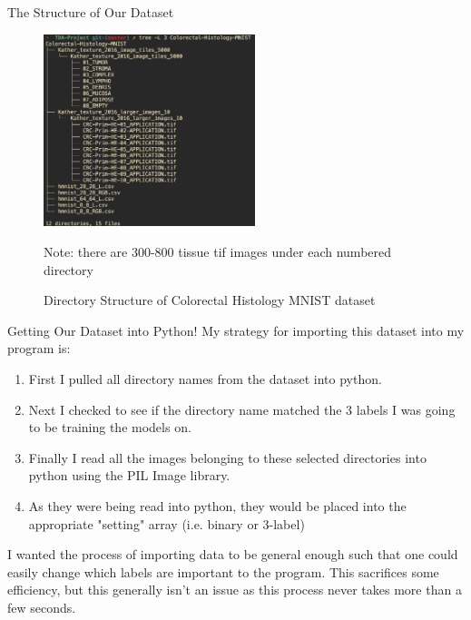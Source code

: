 \documentclass[11pt]{beamer}
\begin{document}
\begin{frame}{The Structure of Our Dataset}
    \begin{figure}
        \caption{Directory Structure of Colorectal Histology MNIST dataset}
        \centering
        \includegraphics[width=0.55\textwidth]{imagens/dataset_directory_structure.png}

        Note: there are 300-800 tissue tif images under each numbered directory
    \end{figure}
\end{frame}

\begin{frame}{Getting Our Dataset into Python!}
    My strategy for importing this dataset into my program is:
    \begin{enumerate}
        \item First I pulled all directory names from the dataset into python.
        \item Next I checked to see if the directory name matched the 3 labels I was going to be training the models on.
        \item Finally I read all the images belonging to these selected directories into python using the PIL Image library.
        \item As they were being read into python, they would be placed into the appropriate "setting" array (i.e. binary or 3-label)
    \end{enumerate}

    \vspace{3mm}

    \par I wanted the process of importing data to be general enough such that one could easily change which labels are important to the program. This sacrifices some efficiency, but this generally isn't an issue as this process never takes more than a few seconds.
\end{frame}
\end{document}
